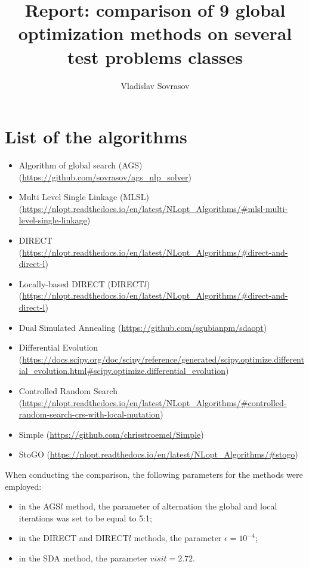 \documentclass[a4paper]{article}
\begin{document}
\title{Report: comparison of 9 global optimization methods on several test problems classes}
\author{Vladislav Sovrasov}
\date{}
\maketitle

\section{List of the algorithms}
\begin{itemize}
  \item Algorithm of global search (AGS) (\url{https://github.com/sovrasov/ags_nlp_solver})
  \item Multi Level Single Linkage (MLSL) (\url{https://nlopt.readthedocs.io/en/latest/NLopt_Algorithms/#mlsl-multi-level-single-linkage})
  \item DIRECT (\url{https://nlopt.readthedocs.io/en/latest/NLopt_Algorithms/#direct-and-direct-l})
  \item Locally-based DIRECT (DIRECT$l$) (\url{https://nlopt.readthedocs.io/en/latest/NLopt_Algorithms/#direct-and-direct-l})
  \item Dual Simulated Annealing (\url{https://github.com/sgubianpm/sdaopt})
  \item Differential Evolution (\url{https://docs.scipy.org/doc/scipy/reference/generated/scipy.optimize.differential_evolution.html#scipy.optimize.differential_evolution})
  \item Controlled Random Search (\url{https://nlopt.readthedocs.io/en/latest/NLopt_Algorithms/#controlled-random-search-crs-with-local-mutation})
  \item Simple (\url{https://github.com/chrisstroemel/Simple})
  \item StoGO (\url{https://nlopt.readthedocs.io/en/latest/NLopt_Algorithms/#stogo})
\end{itemize}

When conducting the comparison, the following parameters for the methods were employed:
\begin{itemize}
  \item in the AGS\(l\) method, the parameter of alternation the
global and local iterations was set to be equal to 5:1;
  \item in the DIRECT and DIRECT\(l\) methods, the parameter \(\epsilon=10^{-4}\);
  \item in the SDA method, the parameter \(visit=2.72\).
\end{itemize}
\end{document}

